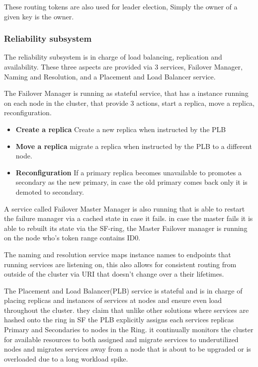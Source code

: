 \documentclass[a4paper,10pt,titlepage]{report}
\begin{document}
    These routing tokens are also used for leader election, Simply the owner of a given key is the owner.

    \subsubsection{Reliability subsystem}
    The reliability subsystem is in charge of load balancing, replication and availability. These three aspects are provided via 3 services, Failover Manager, Naming and Resolution, and a Placement and Load Balancer service.\\
    \vspace{5mm}

    The Failover Manager is running as stateful service, that has a instance running on each node in the cluster, that provide 3 actions, start a replica, move a replica, reconfiguration.\\
    \vspace{5mm}

    \begin{itemize}
        \item \textbf{Create a replica} Create a new replica when instructed by the PLB
        \item \textbf{Move a replica} migrate a replica when instructed by the PLB to a different node.
        \item \textbf{Reconfiguration} If a primary replica becomes unavailable to promotes a secondary as the new primary, in case the old primary comes back only it is demoted to secondary.
    \end{itemize}

    A service called Failover Master Manager is also running that is able to restart the failure manager via a cached state in case it fails. in case the master fails it is able to rebuilt its state via the SF-ring, the Master Failover manager is running on the node who's token range contains ID0.\\
    \vspace{5mm}

    The naming and resolution service maps instance names to endpoints that running services are listening on, this also allows for consistent routing from outside of the cluster via URI that doesn't change over a their lifetimes.\\
    \vspace{5mm}

    The Placement and Load Balancer(PLB) service is stateful and is in charge of placing replicas and instances of services at nodes and ensure even load throughout the cluster. they claim that unlike other solutions where services are hashed onto the ring in SF the PLB explicitly assigns each services replicas Primary and Secondaries to nodes in the Ring. it continually monitors the cluster for available resources to both assigned and migrate services to underutilized nodes and migrates services away from a node that is about to be upgraded or is overloaded due to a long workload spike.\\
    \vspace{5mm}
\end{document}
